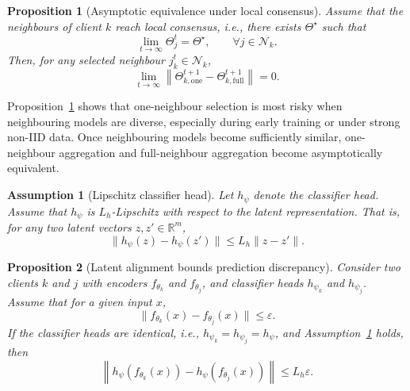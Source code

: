 \documentclass[conference]{IEEEtran}
\newtheorem{assumption}{Assumption}
\newtheorem{proposition}{Proposition}
\begin{document}
\begin{proposition}[Asymptotic equivalence under local consensus]
\label{prop:asymptotic_equivalence}
Assume that the neighbours of client $k$ reach local consensus, i.e., there exists $\Theta^\star$ such that
\begin{equation*}
\lim_{t\rightarrow\infty}
\Theta_j^t
=
\Theta^\star,
\qquad
\forall j\in\mathcal{N}_k.
\end{equation*}
Then, for any selected neighbour $j_k^t\in\mathcal{N}_k$,
\begin{equation*}
\lim_{t\rightarrow\infty}
\left\|
\Theta_{k,\mathrm{one}}^{t+1}
-
\Theta_{k,\mathrm{full}}^{t+1}
\right\|
=
0.
\end{equation*}
\end{proposition}

Proposition~\ref{prop:asymptotic_equivalence} shows that one-neighbour selection is most risky when neighbouring models are diverse, especially during early training or under strong non-IID data. Once neighbouring models become sufficiently similar, one-neighbour aggregation and full-neighbour aggregation become asymptotically equivalent.

\begin{assumption}[Lipschitz classifier head]
\label{ass:lipschitz_classifier}
Let $h_{\psi}$ denote the classifier head. Assume that $h_{\psi}$ is $L_h$-Lipschitz with respect to the latent representation. That is, for any two latent vectors $z,z'\in\mathbb{R}^m$,
\begin{equation*}
\|h_{\psi}(z)-h_{\psi}(z')\|
\leq
L_h\|z-z'\|.
\end{equation*}
\end{assumption}

\begin{proposition}[Latent alignment bounds prediction discrepancy]
\label{prop:latent_alignment}
Consider two clients $k$ and $j$ with encoders $f_{\theta_k}$ and $f_{\theta_j}$, and classifier heads $h_{\psi_k}$ and $h_{\psi_j}$. Assume that for a given input $x$,
\begin{equation*}
\|f_{\theta_k}(x)-f_{\theta_j}(x)\|
\leq
\varepsilon.
\end{equation*}
If the classifier heads are identical, i.e., $h_{\psi_k}=h_{\psi_j}=h_{\psi}$, and Assumption~\ref{ass:lipschitz_classifier} holds, then
\begin{equation*}
\left\|
h_{\psi}(f_{\theta_k}(x))
-
h_{\psi}(f_{\theta_j}(x))
\right\|
\leq
L_h\varepsilon.
\end{equation*}
\end{proposition}
\end{document}
